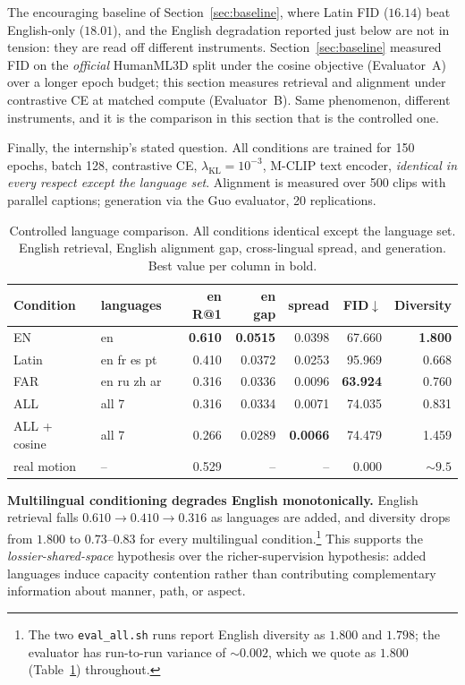 \documentclass[11pt,a4paper]{report}
\newcommand{\best}[1]{\textbf{#1}}
\newcommand{\lkl}{\ensuremath{\lambda_{\mathrm{KL}}}}
\begin{document}
The encouraging baseline of Section~\ref{sec:baseline}, where Latin FID
($16.14$) beat English-only ($18.01$), and the English degradation reported
just below are not in tension: they are read off different instruments.
Section~\ref{sec:baseline} measured FID on the \emph{official} HumanML3D
split under the cosine objective (Evaluator~A) over a longer epoch budget;
this section measures retrieval and alignment under contrastive CE at
matched compute (Evaluator~B). Same phenomenon, different instruments, and
it is the comparison in this section that is the controlled one.

Finally, the internship's stated question. All conditions are trained for
150 epochs, batch 128, contrastive CE, $\lkl=10^{-3}$, M-CLIP text encoder,
\emph{identical in every respect except the language set}. Alignment is
measured over 500 clips with parallel captions; generation via the Guo
evaluator, 20 replications.

\begin{table}[H]
\centering
\caption{Controlled language comparison. All conditions identical except
the language set. English retrieval, English alignment gap, cross-lingual
spread, and generation. Best value per column in bold.}
\label{tab:controlled}
\small
\begin{tabular}{@{}llrrrrr@{}}
\toprule
Condition & languages & en R@1 & en gap & spread & FID$\downarrow$ & Diversity \\
\midrule
EN            & en          & \best{0.610} & \best{0.0515} & 0.0398 & 67.660 & \best{1.800} \\
Latin         & en fr es pt & 0.410 & 0.0372 & 0.0253 & 95.969 & 0.668 \\
FAR           & en ru zh ar & 0.316 & 0.0336 & 0.0096 & \best{63.924} & 0.760 \\
ALL           & all 7       & 0.316 & 0.0334 & 0.0071 & 74.035 & 0.831 \\
ALL + cosine  & all 7       & 0.266 & 0.0289 & \best{0.0066} & 74.479 & 1.459 \\
real motion   & --         & 0.529 & --    & --    & 0.000 & ${\sim}9.5$ \\
\bottomrule
\end{tabular}
\end{table}

\textbf{Multilingual conditioning degrades English monotonically.} English
retrieval falls $0.610\to0.410\to0.316$ as languages are added, and
diversity drops from $1.800$ to $0.73$--$0.83$ for every multilingual
condition.\footnote{The two \texttt{eval\_all.sh} runs report English
diversity as $1.800$ and $1.798$; the evaluator has run-to-run variance of
${\sim}0.002$, which we quote as $1.800$ (Table~\ref{tab:controlled})
throughout.} This supports the \emph{lossier-shared-space} hypothesis over
the richer-supervision hypothesis: added languages induce capacity
contention rather than contributing complementary information about manner,
path, or aspect.
\end{document}
